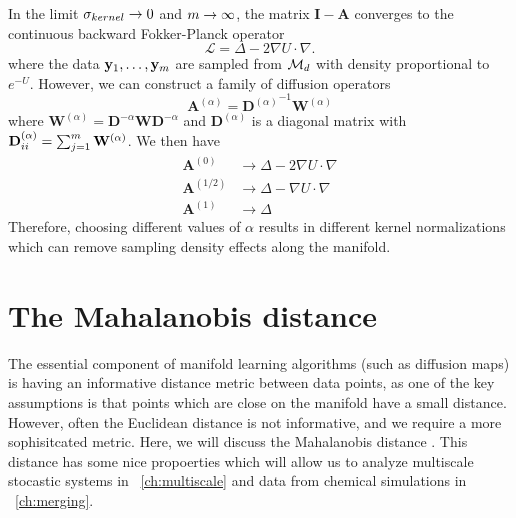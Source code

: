 In the limit $\sigma_{kernel} \rightarrow 0$ and $m \rightarrow \infty$, the matrix $\mathbf{I} - \mathbf{A}$ converges to the continuous backward Fokker-Planck operator \cite{nadler2006diffusion}
\begin{equation}
	\mathcal{L} = \Delta - 2 \nabla U \cdot \nabla.
	\label{eq:limiting_operator}
\end{equation}
where the data $\mathbf{y}_1, \dots , \mathbf{y}_m$ are sampled from $\mathcal{M}_d$ with density proportional to $e^{-U}$. 
%
However, we can construct a family of diffusion operators 
\begin{equation} \label{eq:kernel2}
\mathbf{A}^{(\alpha)} = {\mathbf{D}^{(\alpha)}}^{-1} \mathbf{W}^{(\alpha)}
\end{equation}
where $\mathbf{W}^{(\alpha)} = \mathbf{D}^{-\alpha} \mathbf{W} \mathbf{D}^{-\alpha}$ 
and $\mathbf{D}^{(\alpha)}$ is a diagonal matrix with $\mathbf{D}^{(\alpha)}_{ii} = \sum_{j=1}^m \mathbf{W}^{(\alpha)}$.
%
We then have \cite{coifman2005geometric}
\begin{equation}
\begin{aligned}
\mathbf{A}^{(0)} & \rightarrow \Delta - 2 \nabla U \cdot \nabla \\
\mathbf{A}^{(1/2)} & \rightarrow \Delta - \nabla U \cdot \nabla \\
\mathbf{A}^{(1)} & \rightarrow \Delta  
\end{aligned}
\end{equation}
%
Therefore, choosing different values of $\alpha$ results in different kernel normalizations which can remove sampling density effects along the manifold. 


\section{The Mahalanobis distance}
\label{subsec:mahalanobis}

The essential component of manifold learning algorithms (such as diffusion maps) is having an informative distance metric between data points, as one of the key assumptions is that points which are close on the manifold have a small distance. 
%
However, often the Euclidean distance is not informative, and we require a more sophisitcated metric. 
%
Here, we will discuss the Mahalanobis distance \cite{mahalanobis1936generalized}. 
%
This distance has some nice propoerties which will allow us to analyze multiscale stocastic systems in \chap~\ref{ch:multiscale} and data from chemical simulations in \chap~\ref{ch:merging}. 

